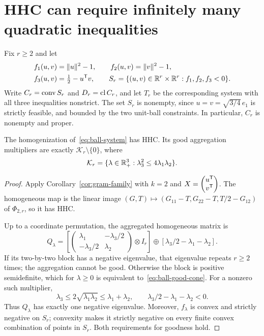 \section{HHC can require infinitely many quadratic inequalities}
\label{sec:infinite-aggregation}

Fix $r\geq2$ and let
\begin{equation}\label{eq:ball-system}
 \begin{split}
 f_1(u,v)&=\|u\|^2-1,\qquad f_2(u,v)=\|v\|^2-1,\\
 f_3(u,v)&=\tfrac12-u^{\mathsf T} v,\qquad
 S_r=\{(u,v)\in\mathbb R^r\times\mathbb R^r:f_1,f_2,f_3<0\}.
 \end{split}
\end{equation}
Write $C_r=\operatorname{conv} S_r$ and $D_r=\operatorname{cl} C_r$, and let $T_r$ be the
corresponding system with all three inequalities nonstrict.
The set $S_r$ is nonempty, since
$u=v=\sqrt{3/4}\,e_1$ is strictly feasible, and bounded by the two
unit-ball constraints. In particular, $C_r$ is nonempty and proper.

\begin{proposition}\label{prop:ball-good-cone}
The homogenization of~\eqref{eq:ball-system} has HHC. Its good
aggregation multipliers are exactly $\mathcal K_r\setminus\{0\}$, where
\begin{equation}\label{eq:ball-good-cone}
 \mathcal K_r=\{\lambda\in\mathbb R^3_+:\lambda_3^2\leq4\lambda_1\lambda_2\}.
\end{equation}
\end{proposition}
\begin{proof}
Apply Corollary~\ref{cor:gram-family} with $k=2$ and
$X=\begin{pmatrix}u^{\mathsf T}\\v^{\mathsf T}\end{pmatrix}$.
The homogeneous map is the linear image
$(G,T)\mapsto(G_{11}-T,G_{22}-T,T/2-G_{12})$ of
$\Phi_{2,r}$, so it has HHC.

Up to a coordinate permutation, the aggregated homogeneous matrix is
\begin{equation}\label{eq:ball-block-matrix}
 Q_\lambda=
 \left[\begin{pmatrix}
 \lambda_1&-\lambda_3/2\\-\lambda_3/2&\lambda_2
 \end{pmatrix}\otimes I_r\right]
 \oplus[\lambda_3/2-\lambda_1-\lambda_2].
\end{equation}
If its two-by-two block has a negative eigenvalue, that eigenvalue
repeats $r\geq2$ times; the aggregation cannot be good. Otherwise
the block is positive semidefinite, which for $\lambda\geq0$ is
equivalent to~\eqref{eq:ball-good-cone}. For a nonzero such multiplier,
\[
 \lambda_3\leq2\sqrt{\lambda_1\lambda_2}
 \leq\lambda_1+\lambda_2,
 \qquad \lambda_3/2-\lambda_1-\lambda_2<0.
\]
Thus $Q_\lambda$ has exactly one negative eigenvalue. Moreover,
$f_\lambda$ is convex and strictly negative on $S_r$; convexity
makes it strictly negative on every finite convex combination of
points in $S_r$. Both requirements for goodness hold.
\end{proof}

